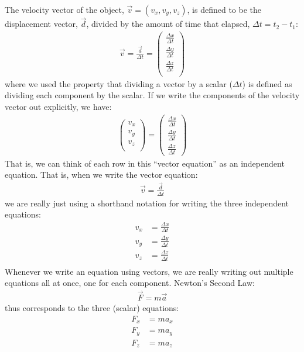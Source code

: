 

 The velocity vector of the object, $\vec v=(v_x, v_y, v_z)$, is defined to be the displacement vector, $\vec d$, divided by the amount of time that elapsed, $\Delta t=t_2-t_1$:
\begin{align*}
\vec v = \frac{\vec d}{\Delta t}=\begin{pmatrix}
           \frac{\Delta x}{\Delta t} \\
           \frac{\Delta y}{\Delta t} \\
           \frac{\Delta z}{\Delta t} \\
         \end{pmatrix}
\end{align*}
where we used the property that dividing a vector by a scalar ($\Delta t$) is defined as dividing each component by the scalar. If we write the components of the velocity vector out explicitly, we have:
\begin{align*}
\begin{pmatrix}
           v_x \\
           v_y \\
           v_z \\
         \end{pmatrix} = \begin{pmatrix}
           \frac{\Delta x}{\Delta t} \\
           \frac{\Delta y}{\Delta t} \\
           \frac{\Delta z}{\Delta t}
         \end{pmatrix}
\end{align*}
That is, we can think of each row in this ``vector equation'' as an independent equation. That is, when we write the vector equation:
\begin{align*}
\vec v = \frac{\vec d}{\Delta t}
\end{align*}
we are really just using a shorthand notation for writing the three independent equations:
\begin{align*}
v_x &= \frac{\Delta x}{\Delta t} \\
v_y &= \frac{\Delta y}{\Delta t} \\
v_z &= \frac{\Delta z}{\Delta t} \\
\end{align*}
Whenever we write an equation using vectors, we are really writing out multiple equations all at once, one for each component. Newton's Second Law:
\begin{align*}
\vec F = m \vec a
\end{align*}
thus corresponds to the three (scalar) equations:
\begin{align*}
F_x &= ma_x\\
F_y &= ma_y\\
F_z &= ma_z\\
\end{align*}
